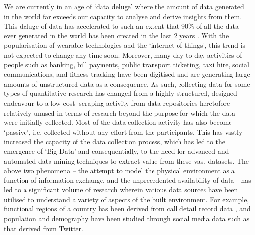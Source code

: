 We are currently in an age of `data deluge' where the amount of data generated in the world far exceeds our capacity to analyse and derive insights from them.
This deluge of data has accelerated to such an extent that 90\% of all the data ever  generated in the world has been created in the last 2 years \cite{ibm2016}.
With the popularisation of wearable technologies  and the `internet of things', this trend is not expected to change any time soon.
Moreover, many day-to-day  activities of people such  as banking, bill payments, public transport ticketing, taxi hire, social communications, and fitness tracking have been digitised and are generating large amounts of unstructured data as a consequence.
As such, collecting data for some types of quantitative research has changed from a highly structured, designed endeavour to a low cost, scraping activity from data repositories heretofore relatively unused in terms of research beyond the purpose for which the data were initially collected.
Most of the data collection activity has also become `passive', i.e. collected without any effort from the participants.
This has vastly increased the capacity of the data collection process, which has led to the emergence of `Big Data' and consequentially, to the need for advanced and automated data-mining techniques to extract value from these vast datasets.
The above two phenomena – the attempt to model the physical environment as a function of information exchange, and the unprecedented availability of data - has led to a significant volume of research wherein various data sources have been utilised to understand a variety of aspects of the built environment.
For example, functional regions of a country has been derived from call detail record data \cite{ratti2010}, and population and demography have been studied through social media data such as that derived from Twitter.

